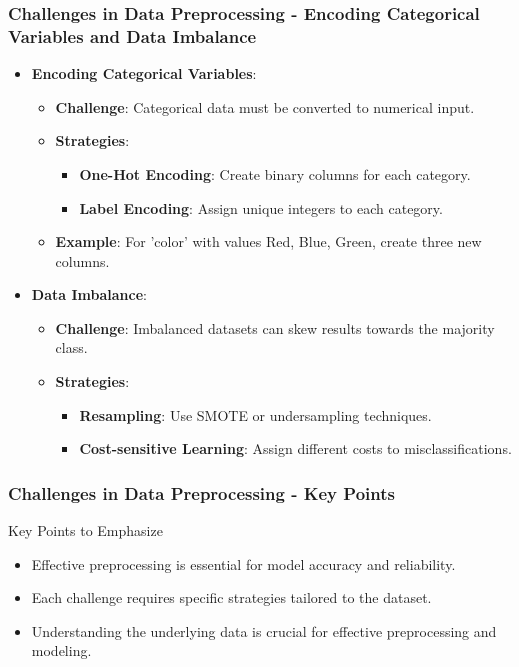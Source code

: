 \documentclass[aspectratio=169]{beamer}
\begin{document}
\begin{frame}[fragile]
    \frametitle{Challenges in Data Preprocessing - Encoding Categorical Variables and Data Imbalance}
    \begin{itemize}
        \item \textbf{Encoding Categorical Variables}:
            \begin{itemize}
                \item \textbf{Challenge}: Categorical data must be converted to numerical input.
                \item \textbf{Strategies}:
                    \begin{itemize}
                        \item \textbf{One-Hot Encoding}: Create binary columns for each category.
                        \item \textbf{Label Encoding}: Assign unique integers to each category.
                    \end{itemize}
                \item \textbf{Example}: For 'color' with values {Red, Blue, Green}, create three new columns.
            \end{itemize}

        \item \textbf{Data Imbalance}:
            \begin{itemize}
                \item \textbf{Challenge}: Imbalanced datasets can skew results towards the majority class.
                \item \textbf{Strategies}:
                    \begin{itemize}
                        \item \textbf{Resampling}: Use SMOTE or undersampling techniques.
                        \item \textbf{Cost-sensitive Learning}: Assign different costs to misclassifications.
                    \end{itemize}
            \end{itemize}
    \end{itemize}
\end{frame}

\begin{frame}[fragile]
    \frametitle{Challenges in Data Preprocessing - Key Points}
    \begin{block}{Key Points to Emphasize}
        \begin{itemize}
            \item Effective preprocessing is essential for model accuracy and reliability.
            \item Each challenge requires specific strategies tailored to the dataset.
            \item Understanding the underlying data is crucial for effective preprocessing and modeling.
        \end{itemize}
    \end{block}
\end{frame}
\end{document}
